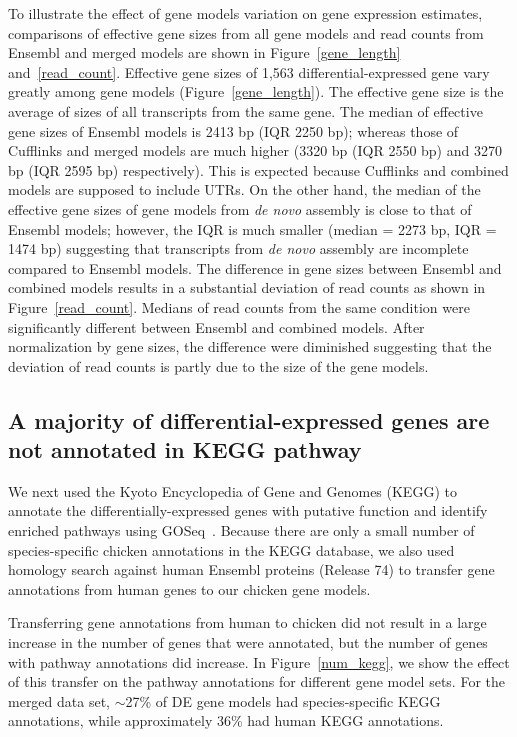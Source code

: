 To illustrate the effect of gene models variation on gene
expression estimates, comparisons of effective gene sizes
from all gene models and read counts from Ensembl and merged
models are shown in Figure~\ref{gene_length}
and~\ref{read_count}.  Effective gene sizes of 1,563
differential-expressed gene vary greatly among gene models
(Figure~\ref{gene_length}). The effective gene size is the
average of sizes of all transcripts from the same gene.  The
median of effective gene sizes of Ensembl models is 2413 bp
(IQR 2250 bp); whereas those of Cufflinks and merged models
are much higher (3320 bp (IQR 2550 bp) and 3270 bp (IQR 2595
bp) respectively).  This is expected because Cufflinks and
combined models are supposed to include UTRs.  On the other
hand, the median of the effective gene sizes of gene models
from {\em de novo} assembly is close to that of Ensembl
models; however, the IQR is much smaller (median = 2273 bp,
IQR = 1474 bp) suggesting that transcripts from \textit{de
novo} assembly are incomplete compared to Ensembl models.
The difference in gene sizes between Ensembl and combined
models results in a substantial deviation of read counts as
shown in Figure~\ref{read_count}.  Medians of read counts
from the same condition were significantly different between
Ensembl and combined models.  After normalization by gene
sizes, the difference were diminished suggesting that the
deviation of read counts is partly due to the size of the
gene models. 

\subsection{A majority of differential-expressed genes are
not annotated in KEGG pathway}

We next used the Kyoto Encyclopedia of Gene and Genomes
(KEGG) to annotate the differentially-expressed genes with
putative function and identify enriched pathways using
GOSeq~\cite{young2010method}.  Because there are only a
small number of species-specific chicken annotations in the
KEGG database, we also used homology search against human
Ensembl proteins (Release 74) to transfer gene annotations
from human genes to our chicken gene models.

Transferring gene annotations from human to chicken did not
result in a large increase in the number of genes that were
annotated, but the number of genes with pathway annotations
did increase.  In Figure~\ref{num_kegg}, we show the effect
of this transfer on the pathway annotations for different
gene model sets.
For the merged data set, $\sim$27\% of DE gene models had
species-specific KEGG annotations, while approximately 36\%
had human KEGG annotations.

